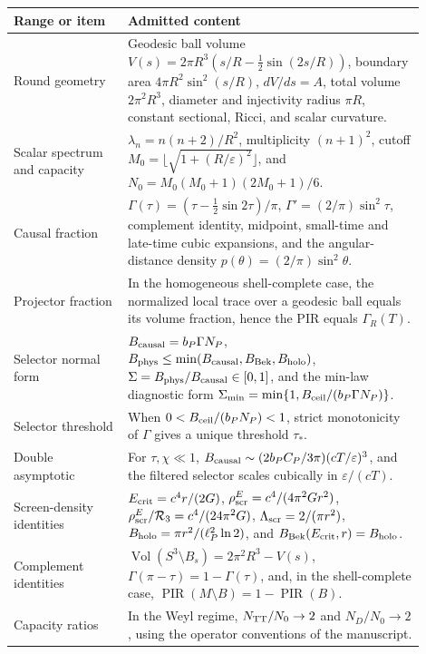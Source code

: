 \documentclass[11pt,a4paper]{article}
\begin{document}
\begin{center}
\small
\begin{tabular}{p{0.25\linewidth}p{0.65\linewidth}}
\toprule
Range or item & Admitted content\\
\midrule
Round geometry & Geodesic ball volume \(V(s)=2\pi R^3(s/R-\frac12\sin(2s/R))\), boundary area \(4\pi R^2\sin^2(s/R)\), \(dV/ds=A\), total volume \(2\pi^2R^3\), diameter and injectivity radius \(\pi R\), constant sectional, Ricci, and scalar curvature.\\
Scalar spectrum and capacity & \(\lambda_n=n(n+2)/R^2\), multiplicity \((n+1)^2\), cutoff \(M_0=\lfloor\sqrt{1+(R/\varepsilon)^2}\rfloor\), and \(N_0=M_0(M_0+1)(2M_0+1)/6\).\\
Causal fraction & \(\Gamma(\tau)=(\tau-\frac12\sin2\tau)/\pi\), \(\Gamma'=(2/\pi)\sin^2\tau\), complement identity, midpoint, small-time and late-time cubic expansions, and the angular-distance density \(p(\theta)=(2/\pi)\sin^2\theta\).\\
Projector fraction & In the homogeneous shell-complete case, the normalized local trace over a geodesic ball equals its volume fraction, hence the PIR equals \(\Gamma_R(T)\).\\
Selector normal form & \(B_{\rm causal}=b_P\Gamma N_P\), \(B_{\rm phys}\le\min(B_{\rm causal},B_{\rm Bek},B_{\rm holo})\), \(\Sigma=B_{\rm phys}/B_{\rm causal}\in[0,1]\), and the min-law diagnostic form \(\Sigma_{\rm min}=\min\{1,B_{\rm ceil}/(b_P\Gamma N_P)\}\).\\
Selector threshold & When \(0<B_{\rm ceil}/(b_PN_P)<1\), strict monotonicity of \(\Gamma\) gives a unique threshold \(\tau_*\).\\
Double asymptotic & For \(\tau,\chi\ll1\), \(B_{\rm causal}\sim(2b_PC_P/3\pi)(cT/\varepsilon)^3\), and the filtered selector scales cubically in \(\varepsilon/(cT)\).\\
Screen-density identities & \(E_{\rm crit}=c^4r/(2G)\), \(\rho_{\rm scr}^E=c^4/(4\pi^2Gr^2)\), \(\rho_{\rm scr}^E/\mathcal R_3=c^4/(24\pi^2G)\), \(\Lambda_{\rm scr}=2/(\pi r^2)\), \(B_{\rm holo}=\pi r^2/(\ell_P^2\ln2)\), and \(B_{\rm Bek}(E_{\rm crit},r)=B_{\rm holo}\).\\
Complement identities & \(\operatorname{Vol}(S^3\setminus B_s)=2\pi^2R^3-V(s)\), \(\Gamma(\pi-\tau)=1-\Gamma(\tau)\), and, in the shell-complete case, \(\operatorname{PIR}(M\setminus B)=1-\operatorname{PIR}(B)\).\\
Capacity ratios & In the Weyl regime, \(N_{\rm TT}/N_0\to2\) and \(N_D/N_0\to2\), using the operator conventions of the manuscript.\\
\bottomrule
\end{tabular}
\end{center}
\end{document}

